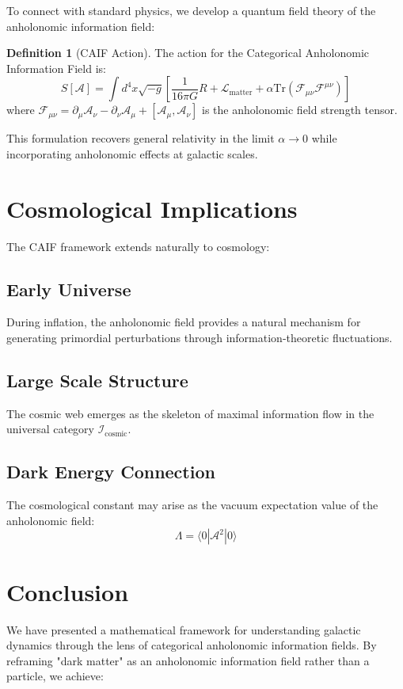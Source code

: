 \documentclass[11pt]{article}
\theoremstyle{definition}
\newtheorem{definition}{Definition}[section]
\theoremstyle{remark}
\begin{document}
To connect with standard physics, we develop a quantum field theory of the anholonomic information field:

\begin{definition}[CAIF Action]
The action for the Categorical Anholonomic Information Field is:
\[ S[\mathcal{A}] = \int d^4x \sqrt{-g} \left[ \frac{1}{16\pi G} R + \mathcal{L}_{\text{matter}} + \alpha \text{Tr}(\mathcal{F}_{\mu\nu}\mathcal{F}^{\mu\nu}) \right] \]
where \( \mathcal{F}_{\mu\nu} = \partial_\mu \mathcal{A}_\nu - \partial_\nu \mathcal{A}_\mu + [\mathcal{A}_\mu, \mathcal{A}_\nu] \) is the anholonomic field strength tensor.
\end{definition}

This formulation recovers general relativity in the limit \( \alpha \to 0 \) while incorporating anholonomic effects at galactic scales.

\section{Cosmological Implications}

The CAIF framework extends naturally to cosmology:

\subsection{Early Universe}
During inflation, the anholonomic field provides a natural mechanism for generating primordial perturbations through information-theoretic fluctuations.

\subsection{Large Scale Structure}
The cosmic web emerges as the skeleton of maximal information flow in the universal category \( \mathcal{I}_{\text{cosmic}} \).

\subsection{Dark Energy Connection}
The cosmological constant may arise as the vacuum expectation value of the anholonomic field:
\[ \Lambda = \langle 0 | \mathcal{A}^2 | 0 \rangle \]

\section{Conclusion}

We have presented a mathematical framework for understanding galactic dynamics through the lens of categorical anholonomic information fields. By reframing "dark matter" as an anholonomic information field rather than a particle, we achieve:
\end{document}
